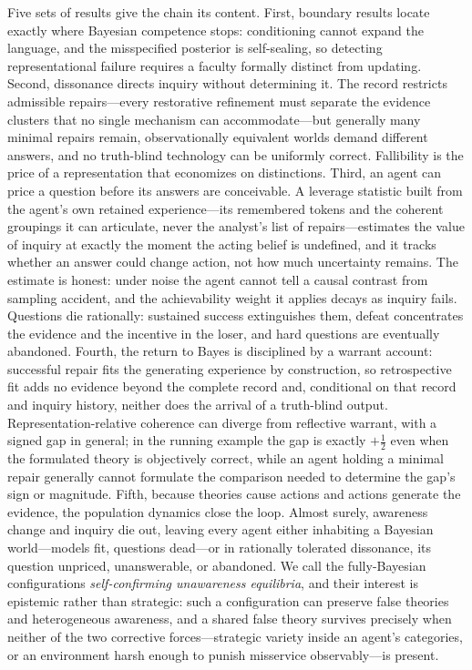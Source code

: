 \documentclass[11pt]{article}
\theoremstyle{definition}
\begin{document}
Five sets of results give the chain its content.
First, boundary results locate exactly where Bayesian competence stops: conditioning cannot expand the language, and the misspecified posterior is self-sealing, so detecting representational failure requires a faculty formally distinct from updating.
Second, dissonance directs inquiry without determining it.
The record restricts admissible repairs---every restorative refinement must separate the evidence clusters that no single mechanism can accommodate---but generally many minimal repairs remain, observationally equivalent worlds demand different answers, and no truth-blind technology can be uniformly correct.
Fallibility is the price of a representation that economizes on distinctions.
Third, an agent can price a question before its answers are conceivable.
A leverage statistic built from the agent's own retained experience---its remembered tokens and the coherent groupings it can articulate, never the analyst's list of repairs---estimates the value of inquiry at exactly the moment the acting belief is undefined, and it tracks whether an answer could change action, not how much uncertainty remains.
The estimate is honest: under noise the agent cannot tell a causal contrast from sampling accident, and the achievability weight it applies decays as inquiry fails.
Questions die rationally: sustained success extinguishes them, defeat concentrates the evidence and the incentive in the loser, and hard questions are eventually abandoned.
Fourth, the return to Bayes is disciplined by a warrant account: successful repair fits the generating experience by construction, so retrospective fit adds no evidence beyond the complete record and, conditional on that record and inquiry history, neither does the arrival of a truth-blind output.
Representation-relative coherence can diverge from reflective warrant, with a signed gap in general; in the running example the gap is exactly $+\tfrac12$ even when the formulated theory is objectively correct, while an agent holding a minimal repair generally cannot formulate the comparison needed to determine the gap's sign or magnitude.
Fifth, because theories cause actions and actions generate the evidence, the population dynamics close the loop.
Almost surely, awareness change and inquiry die out, leaving every agent either inhabiting a Bayesian world---models fit, questions dead---or in rationally tolerated dissonance, its question unpriced, unanswerable, or abandoned.
We call the fully-Bayesian configurations \emph{self-confirming unawareness equilibria}, and their interest is epistemic rather than strategic: such a configuration can preserve false theories and heterogeneous awareness, and a shared false theory survives precisely when neither of the two corrective forces---strategic variety inside an agent's categories, or an environment harsh enough to punish misservice observably---is present.
\end{document}
